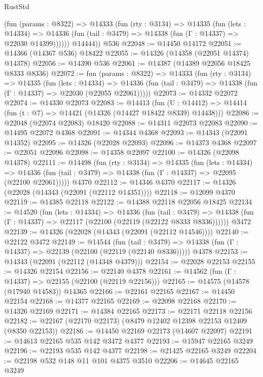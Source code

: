 \begin{lexlean}{RustStd}
\begin{coremodule}
          (fun (params : @8322) =>
          @14333
            (fun (rty : @3134) =>
            @14335
              (fun (lets : @14334) =>
              @14336 (fun (tail : @3479) => @14338 (fun (Γ : @14337) => @22030 @14399))))))
        @14444))
    @536
@22048 := @14450 @14172
@22051 := @14366 (@14367 @536) @18422
@22055 := @14326 (@14358 (@22051 @14374) @14378)
@22056 := @14390 @536
@22061 := @14387 (@14389 @22056 @18425 @8333 @8336)
@22072 := fun (params : @8322) =>
  @14333
    (fun (rty : @3134) =>
    @14335
      (fun (lets : @14334) =>
      @14336 (fun (tail : @3479) => @14338 (fun (Γ : @14337) => @22030 (@22055 @22061)))))
@22073 := @14332 @22072
@22074 := @14330 @22073
@22083 := @14413
    (fun (U : @14412) => @14414 (fun (t : @7) => @14421 (@14326 (@14427 @18422 @8339) @14438)))
@22086 := @22048 (@22074 @22083) @18420
@22088 := @14311 @22073 @22083
@22090 := @14495 @22072 @4368
@22091 := @14344 @4368
@22093 := @14343 (@22091 @14352)
@22095 := @14326 (@22028 @22093)
@22096 := @14373 @4368
@22097 := @22051 @22096
@22098 := @14358 @22097
@22100 := @14326 (@22098 @14378)
@22111 := @14498
    (fun (rty : @3134) =>
    @14335
      (fun (lets : @14334) =>
      @14336 (fun (tail : @3479) => @14338 (fun (Γ : @14337) => @22095 (@22100 @22061)))))
    @4370
@22112 := @14346 @4370
@22117 := @14326 (@22028 (@14343 (@22091 (@22112 @14351))))
@22118 := @12099 @4370
@22119 := @14385 @22118
@22122 := @14388 @22118 @22056 @18425
@22134 := @14520
    (fun (lets : @14334) =>
    @14336
      (fun (tail : @3479) =>
      @14338 (fun (Γ : @14337) => @22117 (@22100 (@22119 (@22122 @8333 @8336))))))
    @3472
@22139 := @14326 (@22028 (@14343 (@22091 (@22112 @14546))))
@22140 := @22122 @3472
@22149 := @14544
    (fun (tail : @3479) => @14338 (fun (Γ : @14337) => @22139 (@22100 (@22119 (@22140 @8336)))))
    @4378
@22153 := @14343 (@22091 (@22112 (@14348 @4379)))
@22154 := @22028 @22153
@22155 := @14326 @22154
@22156 := @22140 @4378
@22161 := @14562 (fun (Γ : @14337) => @22155 (@22100 (@22119 @22156)))
@22165 := @14575 (@14578 (@17940 @14583)) @14365
@22166 := @22161 @22165
@22167 := @14450 @22154
@22168 := @14377 @22165
@22169 := @22098 @22168
@22170 := @14326 @22169
@22171 := @14384 @22165
@22173 := @22171 @22118 @22156
@22182 := @22167 (@22170 @22173) (@8479 @12402 @12398 @22153 @12409 (@8350 @22153))
@22186 := @14450 @22169 @22173 (@14607 @22097)
@22191 := @14613 @22165 @535 @142 @3472 @4377
@22193 := @15947 @22165 @3249
@22196 := @22193 @535 @142 @4377
@22198 := @21425 @22165 @3249
@22204 := @22198 @532 @148 @11 @101 @4375 @3510
@22206 := @14645 @22165 @3249

\end{coremodule}
\end{lexlean}
